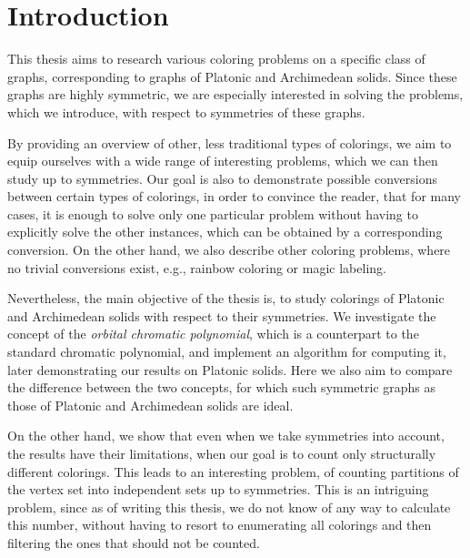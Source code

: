 \chapter*{Introduction}

This thesis aims to research various coloring problems on a specific class of graphs, corresponding to graphs of Platonic and Archimedean solids. Since these graphs are highly symmetric, we are especially interested in solving the problems, which we introduce, with respect to symmetries of these graphs. 

By providing an overview of other, less traditional types of colorings, we aim to equip ourselves with a wide range of interesting problems, which we can then study up to symmetries. Our goal is also to demonstrate possible conversions between certain types of colorings, in order to convince the reader, that for many cases, it is enough to solve only one particular problem without having to explicitly solve the other instances, which can be obtained by a corresponding conversion. On the other hand, we also describe other coloring problems, where no trivial conversions exist, e.g., rainbow coloring or magic labeling.

Nevertheless, the main objective of the thesis is, to study colorings of Platonic and Archimedean solids with respect to their symmetries. We investigate the concept of the \emph{orbital chromatic polynomial}, which is a counterpart to the standard chromatic polynomial, and implement an algorithm for computing it, later demonstrating our results on Platonic solids. Here we also aim to compare the difference between the two concepts, for which such symmetric graphs as those of Platonic and Archimedean solids are ideal.

On the other hand, we show that even when we take symmetries into account, the results have their limitations, when our goal is to count only structurally different colorings. This leads to an interesting problem, of counting partitions of the vertex set into independent sets up to symmetries. This is an intriguing problem, since as of writing this thesis, we do not know of any way to calculate this number, without having to resort to enumerating all colorings and then filtering the ones that should not be counted.


